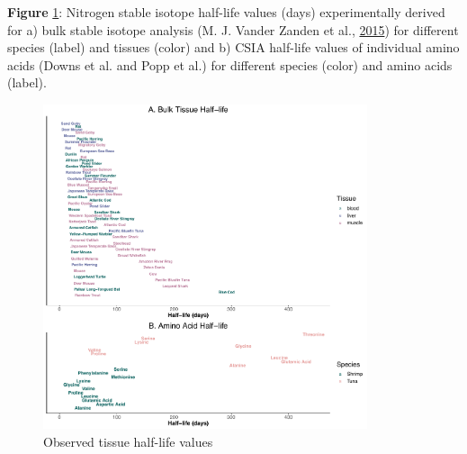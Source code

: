 \documentclass [11pt, proquest] {uwthesis}[2015/03/03]
\begin{document}
\textbf{Figure} \ref{fig:TissueTurn}: Nitrogen stable isotope half-life
values (days) experimentally derived for a) bulk stable isotope analysis
(M. J. Vander Zanden et al.,
\protect\hyperlink{ref-VanderZanden2015}{2015}) for different species
(label) and tissues (color) and b) CSIA half-life values of individual
amino acids (Downs et al. and Popp et al.) for different species (color)
and amino acids (label). \newline
\begin{figure}[h]
\centering
  \includegraphics[width=0.85\textwidth]{figure/Ch5/Figure11.pdf}
  \caption{Observed tissue half-life values}
  \label{fig:TissueTurn}
\end{figure}
\clearpage
\end{document}
